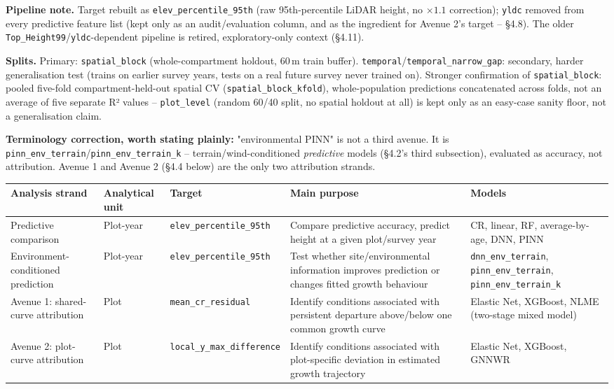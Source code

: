 \documentclass[11pt,a4paper]{report}
\begin{document}
\textbf{Pipeline note.} Target rebuilt as \texttt{elev\_percentile\_95th} (raw 95th-percentile
LiDAR height, no $\times1.1$ correction); \texttt{yldc} removed from every predictive feature list
(kept only as an audit/evaluation column, and as the ingredient for Avenue 2's target -- \S4.8).
The older \texttt{Top\_Height99}/\texttt{yldc}-dependent pipeline is retired, exploratory-only
context (\S4.11).

\textbf{Splits.} Primary: \texttt{spatial\_block} (whole-compartment holdout, 60\,m train buffer).
\texttt{temporal}/\texttt{temporal\_narrow\_gap}: secondary, harder generalisation test (trains on
earlier survey years, tests on a real future survey never trained on). Stronger confirmation of
\texttt{spatial\_block}: pooled five-fold compartment-held-out spatial CV
(\texttt{spatial\_block\_kfold}), whole-population predictions concatenated across folds, not an
average of five separate R² values -- \texttt{plot\_level} (random 60/40 split, no spatial holdout
at all) is kept only as an easy-case sanity floor, not a generalisation claim.

\textbf{Terminology correction, worth stating plainly:} "environmental PINN" is not a third
avenue. It is \texttt{pinn\_env\_terrain}/\texttt{pinn\_env\_terrain\_k} -- terrain/wind-conditioned
\emph{predictive} models (\S4.2's third subsection), evaluated as accuracy, not attribution.
Avenue 1 and Avenue 2 (\S4.4 below) are the only two attribution strands.

\begin{table}[!htbp]
\centering
\scriptsize
\setlength{\tabcolsep}{3pt}
\renewcommand{\arraystretch}{0.95}
\begin{tabular}{p{2.3cm}p{1.4cm}p{3.2cm}p{4.2cm}p{2.5cm}}
\hline
Analysis strand & Analytical unit & Target & Main purpose & Models \\
\hline
Predictive comparison & Plot-year & \texttt{elev\_percentile\_95th} & Compare predictive accuracy, predict height at a given plot/survey year & CR, linear, RF, average-by-age, DNN, PINN \\
Environment-conditioned prediction & Plot-year & \texttt{elev\_percentile\_95th} & Test whether site/environmental information improves prediction or changes fitted growth behaviour & \texttt{dnn\_env\_terrain}, \texttt{pinn\_env\_terrain}, \texttt{pinn\_env\_terrain\_k} \\
Avenue 1: shared-curve attribution & Plot & \texttt{mean\_cr\_residual} & Identify conditions associated with persistent departure above/below one common growth curve & Elastic Net, XGBoost, NLME (two-stage mixed model) \\
Avenue 2: plot-curve attribution & Plot & \texttt{local\_y\_max\_difference} & Identify conditions associated with plot-specific deviation in estimated growth trajectory & Elastic Net, XGBoost, GNNWR \\
\hline
\end{tabular}
\end{table}
\end{document}
